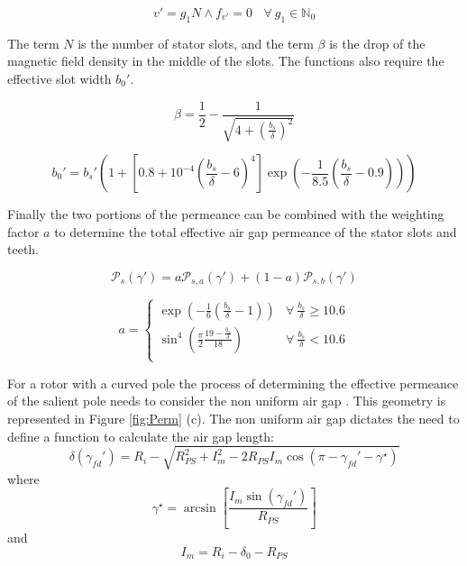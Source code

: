 \begin{equation}\label{Eq:v}
	v' = {g}_{1}N \wedge {f}_{v'} = 0 \:\:\: \:\forall\: {g}_{1} \in \mathbb{N}_{0}
\end{equation}

The term $N$ is the number of stator slots, and the term $\beta$ is the drop of the magnetic field density in the middle of the slots. The functions also require the effective slot width ${b}_{0}'$.

\begin{equation}\label{Eq:Beta}
	\beta = \frac{1}{2} - \frac{1}{\sqrt{4 + \left(\frac{{b}_{s}}{\delta}\right)^{2}}}
\end{equation}

\begin{equation}\label{Eq:EffSlotw}
	{b}_{0}' = {b}_{s}'\left(1 + \left[0.8 + 10^{-4}\left(\frac{{b}_{s}}{\delta} - 6 \right)^{4} \right] \exp\left(-\frac{1}{8.5}\left(\frac{{b}_{s}}{\delta}-0.9\right)\right) \right)
\end{equation}

Finally the two portions of the permeance can be combined with the weighting factor $a$ to determine the total effective air gap permeance of the stator slots and teeth.

\begin{equation}\label{Eq:SOGPerm}
	\mathcal{P}_{s}(\gamma') = a\mathcal{P}_{s,a}(\gamma') + (1-a)\mathcal{P}_{s,b}(\gamma')
\end{equation}

\begin{equation}\label{Eq:SOGPerma}
	a =
	\begin{cases} 
		\exp\left( -\frac{1}{6} \left(\frac{{b}_{s}}{\delta} - 1 \right)\right) & \forall \:  \frac{{b}_{s}}{\delta} \geq 10.6 \\
		\sin^{4}\left(\frac{\pi}{2}\frac{19 - \frac{{b}_{s}}{\delta}}{18}\right) & \forall \: \frac{{b}_{s}}{\delta} < 10.6 \\
	\end{cases}
\end{equation}

For a rotor with a curved pole the process of determining the effective permeance of the salient pole needs to consider the non uniform air gap \cite{AnaGapSal}. This geometry is represented in Figure \ref{fig:Perm} (c). The non uniform air gap dictates the need to define a function to calculate the air gap length:
\begin{equation}\label{Eq:dofgamma}
	\delta({\gamma}_{fd}') = R_{i} - \sqrt{{R}_{PS}^{2} + {I}_{m}^{2} - 2{R}_{PS}{I}_{m}\cos\left(\pi - {\gamma}_{fd}' - {\gamma}^{\star} \right)}
\end{equation}
\hspace{1in}where
\begin{equation}\label{Eq:gammastar}
	{\gamma}^{\star} = \arcsin\left[\frac{{I}_{m}\sin\left({\gamma}_{fd}'\right)}{{R}_{PS}}\right]
\end{equation}
\hspace{1in}and
\begin{equation}\label{Eq:Im}
	{I}_{m} = {R}_{i} - {\delta}_{0} - {R}_{PS}
\end{equation}

